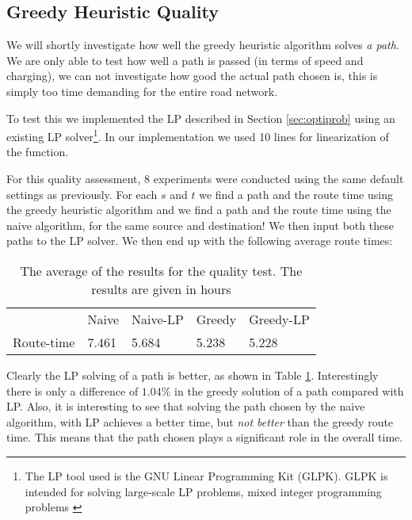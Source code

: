 \subsection{Greedy Heuristic Quality}
We will shortly investigate how well the greedy heuristic algorithm solves \emph{a path}. We are only able to test how well a path is passed (in terms of speed and charging), we can not investigate how good the actual path chosen is, this is simply too time demanding for the entire road network.

To test this we implemented the LP described in Section \ref{sec:optiprob} using an existing LP solver\footnote{The LP tool used is the GNU Linear Programming Kit (GLPK). GLPK is intended for solving large-scale LP problems, mixed integer programming problems \cite{glpk}}. In our implementation we used 10 lines for linearization of the function. 

For this quality assessment, 8 experiments were conducted using the same default settings as previously. For each $s$ and $t$ we find a path and the route time using the greedy heuristic algorithm and we find a path and the route time using the naive algorithm, for the same source and destination! We then input both these paths to the LP solver. We then end up with the following average route times:
\begin{table}[!htb]
\begin{tabular}{ p{1cm} p{1.35cm} p{1.35cm} p{1.25cm} p{1.6cm}}
\hline
& Naive & Naive-LP  & Greedy  & Greedy-LP \\
Route-time & 7.461& 5.684 & 5.238 & 5.228\\
\hline
\end{tabular}
\caption{The average of the results for the quality test. The results are given in hours}
\label{tab:LP}
\end{table}

Clearly the LP solving of a path is better, as shown in Table \ref{tab:LP}. Interestingly there is only a difference of $1.04\%$ in the greedy solution of a path compared with LP. Also, it is interesting to see that solving the path chosen by the naive algorithm, with LP achieves a better time, but \emph{not better} than the greedy route time. This means that the path chosen plays a significant role in the overall time.